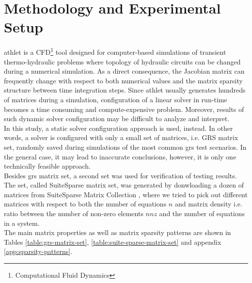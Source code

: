 \chapter{Methodology and Experimental Setup}\label{subseq:matrix-sets-and-hardware}

\acrshort{athlet} is a CFD\footnote{Computational Fluid Dynamics} tool designed for computer-based simulations of transient thermo-hydraulic problems where topology of hydraulic circuits can be changed during a numerical simulation. As a direct consequence, the Jacobian matrix can frequently change with respect to both numerical values and the matrix sparsity structure between time integration steps. Since \acrshort{athlet} usually generates hundreds of matrices during a simulation, configuration of a linear solver in run-time becomes a time consuming and compute-expensive problem. Moreover, results of such dynamic solver configuration may be difficult to analyze and interpret.\\


In this study, a static solver configuration approach is used, instead. In other words, a solver is configured with only a small set of matrices, i.e. GRS matrix set, randomly saved during simulations of the most common \acrshort{grs} test scenarios. In the general case, it may lead to inaccurate conclusions, however, it is only one technically feasible approach.\\


Besides \acrshort{grs} matrix set, a second set was  used for verification of testing results. The set, called SuiteSparse matrix set, was generated by donwloading a dozen of matrices from SuiteSparse Matrix Collection \cite{sparse-matrix-collection:1}, \cite{sparse-matrix-collection:2} where we tried to pick out different matrices with respect to both the number of equations $n$ and matrix density i.e. ratio between the number of non-zero elements $nnz$ and the number of equations in a system.\\ 


The main matrix properties as well as matrix sparsity patterns are shown in Tables \ref{table:grs-matrix-set}, \ref{table:suite-sparse-matrix-set} and appendix \ref{app:sparsity-patterns}.\\



